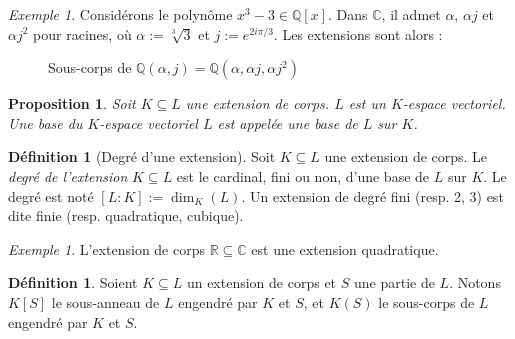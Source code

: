 \documentclass[a4paper, titlepage]{article}
\newtheorem{prop}[theo]{Proposition}
\theoremstyle{definition}
\newtheorem{defi}[theo]{Définition}
\theoremstyle{remark}
\newtheorem{exem}[theo]{Exemple}
\def\Q{\mathbb Q}
\def\R{\mathbb R}
\def\C{\mathbb C}
\begin{document}
\begin{exem}
Considérons le polynôme $x^3-3 \in \Q[x]$. Dans $\C$, il admet $\alpha$, $\alpha j$ et $\alpha j^2$ pour racines, où $\alpha := \sqrt[3]{3}$ et $j := e^{2i\pi/3}$. Les extensions sont alors :

\begin{figure}[h]
\begin{center}
\caption{Sous-corps de $\Q(\alpha,j) = \Q(\alpha,\alpha j, \alpha j^2)$}
\end{center}
\end{figure}

\end{exem}

\begin{prop}
Soit $K \subseteq L$ une extension de corps. $L$ est un $K$-espace vectoriel. Une base du $K$-espace vectoriel $L$ est appelée une base de $L$ sur $K$.
\end{prop}

\begin{defi}[Degré d'une extension]
Soit $K \subseteq L$ une extension de corps. Le \textit{degré de l'extension} $K \subseteq L$ est le cardinal, fini ou non, d'une base de $L$ sur $K$. Le degré est noté $[L:K] := \dim_K(L)$. Un extension de degré fini (resp. 2, 3) est dite finie (resp. quadratique, cubique).
\end{defi}

\begin{exem}
L'extension de corps $\R \subseteq \C$ est une extension quadratique.
\end{exem}

\begin{defi}
Soient $K\subseteq L$ un extension de corps et $S$ une partie de $L$. Notons $K[S]$ le sous-anneau de $L$ engendré par $K$ et $S$, et $K(S)$ le sous-corps de $L$ engendré par $K$ et $S$.
\end{defi}
\end{document}
